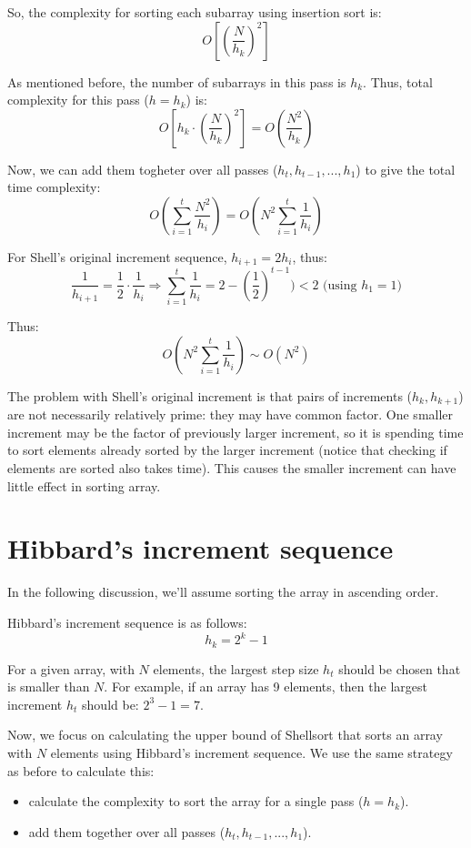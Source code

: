 \documentclass[11pt]{book}
\begin{document}
So, the complexity for sorting each subarray using insertion sort is:
\[
O[(\frac {N} {h_k})^2]
\]

As mentioned before, the number of subarrays in this pass is \(h_k\). Thus, total complexity for this pass (\(h = h _k\)) is:
\[
O[h_k\cdot(\frac {N} {h_k})^2] = O(\frac {N^2} {h_k})
\]

Now, we can add them togheter over all passes (\(h_t, h_{t - 1}, ..., h_1\)) to give the total time complexity:
\[
O(\sum_{i = 1}^{t}\frac {N^2} {h_i}) = O(N^2\sum_{i = 1}^{t} \frac {1} {h_i})
\]

For Shell's original increment sequence, \(h_{i + 1} = 2h_i\), thus:
\[
\frac {1} {h_{i + 1}} = \frac {1} {2} \cdot \frac {1} {h_i} \Rightarrow
\sum_{i = 1}^{t} \frac {1} {h_i} = 2 - (\frac {1} {2})^{t - 1}) < 2 \text { (using } h_1 = 1 \text {)}
\]

Thus:
\[
O(N^2\sum_{i = 1}^{t} \frac {1} {h_i}) \sim O(N^2)
\]

The problem with Shell's original increment is that pairs of increments (\(h_k, h_{k + 1}\)) are not necessarily relatively prime: they may have common factor. One smaller increment may be the factor of previously larger increment, so it is spending time to sort elements already sorted by the larger increment (notice that checking if elements are sorted also takes time). This causes the smaller increment can have little effect in sorting array.
\section{Hibbard's increment sequence}
\label{sec:org0c0b32c}
In the following discussion, we'll assume sorting the array in ascending order.

Hibbard's increment sequence is as follows:
\[
h_k = 2^k - 1
\]

For a given array, with \(N\) elements, the largest step size \(h_t\) should be chosen that is smaller than \(N\). For example, if an array has 9 elements, then the largest increment \(h_t\) should be: \(2^3 - 1 = 7\).

Now, we focus on calculating the upper bound of Shellsort that sorts an array with \(N\) elements using Hibbard's increment sequence. We use the same strategy as before to calculate this:
\begin{itemize}
\item calculate the complexity to sort the array for a single pass (\(h = h_k\)).
\item add them together over all passes (\(h_t, h_{t - 1}, ..., h_1\)).
\end{itemize}
\end{document}
